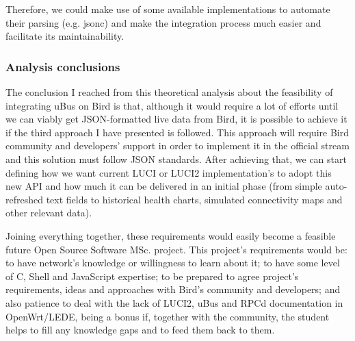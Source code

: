 \begin{enumerate}


Therefore, we could make use of some available implementations to automate their parsing (e.g. \Gls{jsonc}) and make the integration process much easier and facilitate its maintainability.
\end{enumerate}


\subsubsection{Analysis conclusions}
The conclusion I reached from this theoretical analysis about the feasibility of integrating uBus on Bird is that, although it would require a lot of efforts until we can viably get JSON-formatted live data from Bird, it is possible to achieve it if the third approach I have presented is followed. This approach will require Bird community and developers' support in order to implement it in the official stream and this solution must follow JSON standards. After achieving that, we can start defining how we want current LUCI or LUCI2 implementation's to adopt this new API and how much it can be delivered in an initial phase (from simple auto-refreshed text fields to historical health charts, simulated connectivity maps and other relevant data).

Joining everything together, these requirements would easily  become a feasible future Open Source Software MSc. project. This project's requirements would be: to have network's knowledge or willingness to learn about it; to have some level of C, Shell and JavaScript expertise; to be prepared to agree project's requirements, ideas and approaches with Bird's community and developers; and also patience to deal with the lack of LUCI2, uBus and RPCd documentation in OpenWrt/LEDE, being a bonus if, together with the community, the student helps to fill any knowledge gaps and to feed them back to them.

\newpage